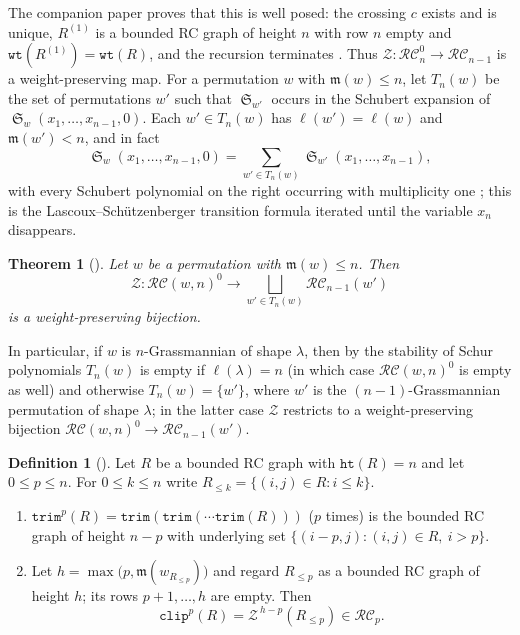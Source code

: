 \documentclass{amsart}
\newtheorem{theorem}{Theorem}[section]
\theoremstyle{definition}
\newtheorem{definition}[lemma]{Definition}
\theoremstyle{remark}
\numberwithin{equation}{subsection}
\DeclareMathOperator{\sch}{\mathfrak{S}}
\newcommand{\wof}[1]{w_{#1}}
\newcommand{\wtt}{\mathtt{wt}}
\newcommand{\trm}{\mathtt{trim}}
\newcommand{\zeromap}{\mathcal{Z}}
\newcommand{\hr}{\mathtt{ht}}
\newcommand{\clp}{\mathtt{clip}}
\newcommand{\RC}{\mathcal{RC}}
\newcommand{\maxd}{\mathfrak{m}}
\begin{document}
The companion paper proves that this is well posed: the crossing $c$ exists and is unique, $R^{(1)}$ is a bounded RC graph of height $n$ with row $n$ empty and $\wtt(R^{(1)})=\wtt(R)$, and the recursion terminates \cite[Lemma~\ref*{B-lemma:zeroweight}]{samuelbialgebra}. Thus $\zeromap:\RC_n^0\to\RC_{n-1}$ is a weight-preserving map. For a permutation $w$ with $\maxd(w)\leq n$, let $T_n(w)$ be the set of permutations $w'$ such that $\sch_{w'}$ occurs in the Schubert expansion of $\sch_w(x_1,\ldots,x_{n-1},0)$. Each $w'\in T_n(w)$ has $\ell(w')=\ell(w)$ and $\maxd(w')<n$, and in fact
\begin{equation}\label{eq:Tn}
\sch_w(x_1,\ldots,x_{n-1},0) = \sum_{w'\in T_n(w)}\sch_{w'}(x_1,\ldots,x_{n-1}),
\end{equation}
with every Schubert polynomial on the right occurring with multiplicity one \cite[(\ref*{B-E:Tn})]{samuelbialgebra}; this is the Lascoux--Sch\"utzenberger transition formula \cite[(4.16)]{notes} iterated until the variable $x_n$ disappears.

\begin{theorem}[{\cite[Theorem~\ref*{B-theorem:zero_bijection}]{samuelbialgebra}}]\label{theorem:zero_bijection}
Let $w$ be a permutation with $\maxd(w)\leq n$. Then
$$\zeromap:\RC(w, n)^{0}\to \bigsqcup_{w'\in T_n(w)}\RC_{n-1}(w')$$
is a weight-preserving bijection.
\end{theorem}

In particular, if $w$ is $n$-Grassmannian of shape $\lambda$, then by the stability of Schur polynomials $T_n(w)$ is empty if $\ell(\lambda)=n$ (in which case $\RC(w,n)^0$ is empty as well) and otherwise $T_n(w)=\{w'\}$, where $w'$ is the $(n-1)$-Grassmannian permutation of shape $\lambda$; in the latter case $\zeromap$ restricts to a weight-preserving bijection $\RC(w,n)^0\to\RC_{n-1}(w')$.

\begin{definition}[{\cite[Definition~\ref*{B-definition:cliptrim}]{samuelbialgebra}}]\label{definition:cliptrim}
Let $R$ be a bounded RC graph with $\hr(R)=n$ and let $0\leq p\leq n$. For $0\leq k\leq n$ write $R_{\leq k}=\{(i,j)\in R: i\leq k\}$.
\begin{enumerate}
\item $\trm^p(R)=\trm(\trm(\cdots\trm(R)))$ ($p$ times) is the bounded RC graph of height $n-p$ with underlying set $\{(i-p,j):(i,j)\in R,\ i>p\}$.
\item Let $h=\max\bigl(p,\maxd(\wof{R_{\leq p}})\bigr)$ and regard $R_{\leq p}$ as a bounded RC graph of height $h$; its rows $p+1,\ldots,h$ are empty. Then
$$\clp^p(R)=\zeromap^{\,h-p}(R_{\leq p})\in\RC_p.$$
\end{enumerate}
\end{definition}
\end{document}
